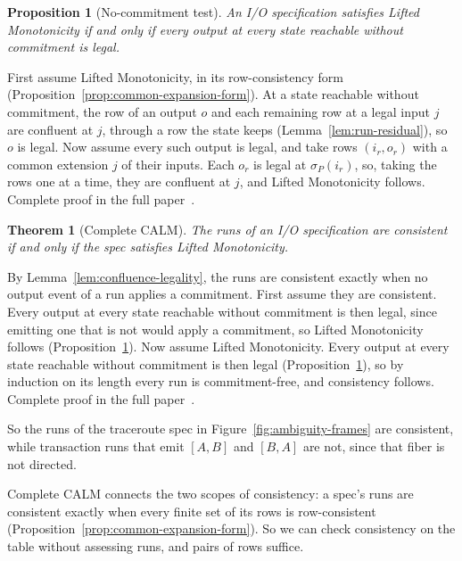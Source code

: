 \documentclass[sigconf]{cidr-2027}
\makeatletter
\newtheorem{theorem}{Theorem}
\newtheorem{proposition}{Proposition}
\theoremstyle{remark}
\newcommand{\commitment}{commitment\xspace}
\newcommand{\spectype}[1][]{I/O specification#1\xspace}
\newcommand{\fullproof}{Complete proof in the full paper~\cite{hellerstein2026completecalmfull}.}
\renewenvironment{proof}[1][\proofname]{\par
  \pushQED{\qed}\normalfont\topsep2\p@\relax
  \trivlist\item[\@proofindent\hskip\labelsep{\@proofnamefont #1\@addpunct{.}}]\ignorespaces
}{\popQED\endtrivlist\@endpefalse}
\makeatother
\begin{document}
\begin{proposition}[No-\commitment test]
\label{prop:exposure-boundary}
An \spectype satisfies Lifted Monotonicity if and only
if every output at every state reachable without \commitment is legal.
\end{proposition}

\begin{proof}[Proof sketch]
First assume Lifted Monotonicity, in its row-consistency form
(Proposition~\ref{prop:common-expansion-form}).  At a state reachable without
\commitment, the row of an output $o$ and each remaining row at a legal input $j$ are confluent at $j$, through a row the state keeps
(Lemma~\ref{lem:run-residual}), so $o$ is legal.  Now assume every such output
is legal, and take rows $(i_r,o_r)$ with a common extension $j$ of their inputs.  Each $o_r$ is
legal at $\sigma_P(i_r)$, so, taking the rows one at a time, they are
confluent at $j$, and Lifted Monotonicity follows.  \fullproof
\end{proof}

\begin{theorem}[Complete CALM]
\label{thm:complete-calm}
The runs of an \spectype are consistent if and only if the spec satisfies
Lifted Monotonicity.
\end{theorem}

\begin{proof}[Proof sketch]
By Lemma~\ref{lem:confluence-legality}, the runs are consistent exactly when
no output event of a run applies a \commitment.  First assume they are
consistent.  Every output at every state reachable without \commitment is then
legal, since emitting one that is not would apply a \commitment, so Lifted
Monotonicity follows (Proposition~\ref{prop:exposure-boundary}).  Now assume
Lifted Monotonicity.  Every output at every state reachable without
\commitment is then legal (Proposition~\ref{prop:exposure-boundary}), so by
induction on its length every run is \commitment-free, and consistency
follows.  \fullproof
\end{proof}

So the runs of the traceroute spec in Figure~\ref{fig:ambiguity-frames} are
consistent, while transaction runs that emit $[A,B]$ and $[B,A]$ are not, since
that fiber is not directed.

Complete CALM connects the two scopes of consistency: a spec's runs are
consistent exactly when every finite set of its rows is row-consistent
(Proposition~\ref{prop:common-expansion-form}).  So we can check consistency
on the table without assessing runs, and pairs of rows suffice.
\end{document}
